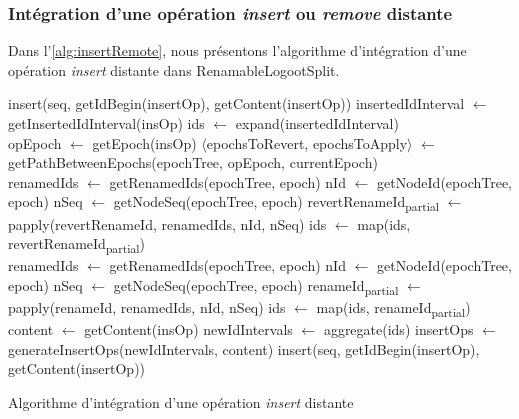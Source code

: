\documentclass[12pt]{thesul}
\begin{document}
\subsubsection{Intégration d'une opération \emph{insert} ou \emph{remove} distante}

\label{sec:integration-process-insert-remove-op}

Dans l'\autoref{alg:insertRemote}, nous présentons l'algorithme d'intégration d'une opération \emph{insert} distante dans RenamableLogootSplit.

\begin{algorithm}[!ht]
  \footnotesize
  \begin{algorithmic}[5]
            \State insert(seq, getIdBegin(insertOp), getContent(insertOp)) \label{alg:insertRemote-insert-1}
          \Else
            \State insertedIdInterval $\gets$ getInsertedIdInterval(insOp) \label{alg:insertRemote-get-ids}
            \State ids $\gets$ expand(insertedIdInterval)
            \\
            \State opEpoch $\gets$ getEpoch(insOp)
            \State $\langle$epochsToRevert, epochsToApply$\rangle$ $\gets$ getPathBetweenEpochs(epochTree, opEpoch, currentEpoch) \label{alg:insertRemote-get-path}
            \\
              \State renamedIds $\gets$ getRenamedIds(epochTree, epoch) \label{alg:insertRemote-retrieve-rename-data-1}
              \State nId $\gets$ getNodeId(epochTree, epoch)
              \State nSeq $\gets$ getNodeSeq(epochTree, epoch) \label{alg:insertRemote-retrieve-rename-data-2}
              \State revertRenameId\textsubscript{partial} $\gets$ papply(revertRenameId, renamedIds, nId, nSeq)
              \State ids $\gets$ map(ids, revertRenameId\textsubscript{partial}) \label{alg:insertRemote-revertRenameId}
            \EndFor
            \\
             \label{alg:insertRemote-renameId-1}
              \State renamedIds $\gets$ getRenamedIds(epochTree, epoch)
              \State nId $\gets$ getNodeId(epochTree, epoch)
              \State nSeq $\gets$ getNodeSeq(epochTree, epoch)
              \State renameId\textsubscript{partial} $\gets$ papply(renameId, renamedIds, nId, nSeq)
              \State ids $\gets$ map(ids, renameId\textsubscript{partial})
            \EndFor \label{alg:insertRemote-renameId-2}
            \\
            \State content $\gets$ getContent(insOp)
            \State newIdIntervals $\gets$ aggregate(ids) \label{alg:insertRemote-aggregate}
            \State insertOps $\gets$ generateInsertOps(newIdIntervals, content) \label{alg:insertRemote-generate}
              \State insert(seq, getIdBegin(insertOp), getContent(insertOp)) \label{alg:insertRemote-insert-2}
            \EndFor
        \EndIf
      \EndFunction
  \end{algorithmic}
  \caption{Algorithme d'intégration d'une opération \emph{insert} distante}
  \label{alg:insertRemote}
\end{algorithm}
\end{document}
